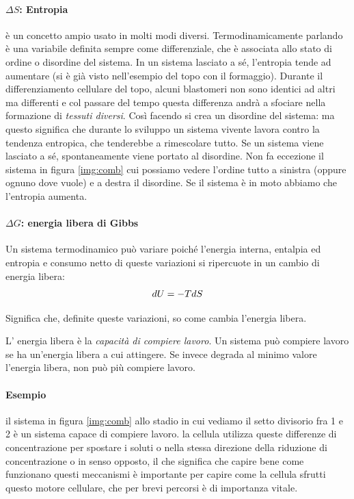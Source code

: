 \documentclass[a4paper,12pt]{article}
\begin{document}
\paragraph{$\Delta S$: Entropia}
è un concetto ampio usato in molti modi diversi. Termodinamicamente parlando è una variabile definita sempre come differenziale, che è associata allo stato di ordine o disordine del sistema.
In un sistema lasciato a sé, l'entropia tende ad aumentare (si è già visto nell'esempio del topo con il formaggio).
Durante il differenziamento cellulare del topo, alcuni blastomeri non sono identici ad altri ma differenti e col passare del tempo questa differenza andrà a sfociare nella formazione di \emph{tessuti diversi}. Così facendo si crea un disordine del sistema: ma questo significa che durante lo sviluppo un sistema vivente lavora contro la tendenza entropica, che tenderebbe a rimescolare tutto.
Se un sistema viene lasciato a sé, spontaneamente viene portato al disordine.
Non fa eccezione il sistema in figura \ref{img:comb} cui possiamo vedere l'ordine tutto a sinistra (oppure ognuno dove vuole) e a destra il disordine. Se il sistema è in moto abbiamo che l'entropia aumenta.

\paragraph{$\Delta G$: energia libera di Gibbs}
Un sistema termodinamico può variare poiché l'energia interna, entalpia ed entropia e consumo netto di queste variazioni si ripercuote in un cambio di energia libera:
\begin{equation*}
\centering
dU=-TdS 
\end{equation*}

Significa che, definite queste variazioni, so come cambia l'energia libera.

L' energia libera è la \emph{capacità di compiere lavoro}.
Un sistema può compiere lavoro se ha un'energia libera a cui attingere. Se invece degrada al minimo valore l'energia libera, non può più compiere lavoro.

\paragraph{Esempio} il sistema in figura \ref{img:comb} allo stadio in cui vediamo il setto divisorio fra 1 e 2 è un sistema capace di compiere lavoro. la cellula utilizza queste differenze di concentrazione per spostare i soluti o nella stessa direzione della riduzione di concentrazione o in senso opposto, il che significa che capire bene come funzionano questi meccanismi è importante per capire come la cellula sfrutti questo motore cellulare, che per brevi percorsi è di importanza vitale.
\end{document}
